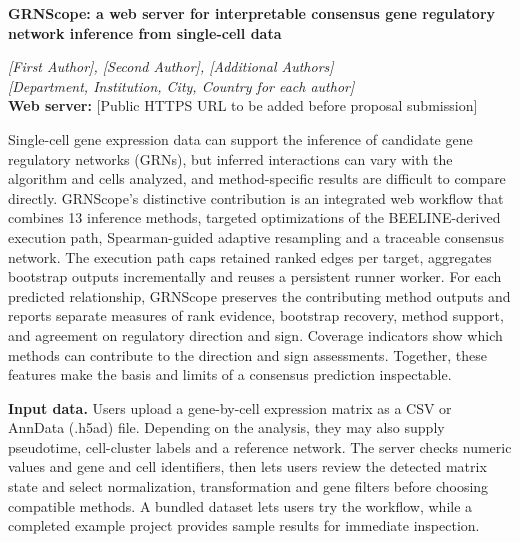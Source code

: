 \documentclass[11pt]{article}
\begin{document}
\begin{center}
{\large\bfseries GRNScope: a web server for interpretable consensus gene regulatory network inference from single-cell data\par}
\vspace{0.4em}
\textit{[First Author], [Second Author], [Additional Authors]}\\
\textit{[Department, Institution, City, Country for each author]}\\
\textbf{Web server:} [Public HTTPS URL to be added before proposal submission]
\end{center}

Single-cell gene expression data can support the inference of candidate gene regulatory networks (GRNs), but inferred interactions can vary with the algorithm and cells analyzed, and method-specific results are difficult to compare directly. GRNScope's distinctive contribution is an integrated web workflow that combines 13 inference methods, targeted optimizations of the BEELINE-derived execution path, Spearman-guided adaptive resampling and a traceable consensus network. The execution path caps retained ranked edges per target, aggregates bootstrap outputs incrementally and reuses a persistent runner worker. For each predicted relationship, GRNScope preserves the contributing method outputs and reports separate measures of rank evidence, bootstrap recovery, method support, and agreement on regulatory direction and sign. Coverage indicators show which methods can contribute to the direction and sign assessments. Together, these features make the basis and limits of a consensus prediction inspectable.

\textbf{Input data.} Users upload a gene-by-cell expression matrix as a CSV or AnnData (.h5ad) file. Depending on the analysis, they may also supply pseudotime, cell-cluster labels and a reference network. The server checks numeric values and gene and cell identifiers, then lets users review the detected matrix state and select normalization, transformation and gene filters before choosing compatible methods. A bundled dataset lets users try the workflow, while a completed example project provides sample results for immediate inspection.
\end{document}
